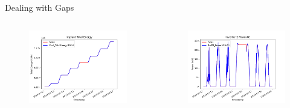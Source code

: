 \begin{frame}{Dealing with Gaps}
\begin{columns}
    \begin{figure}
        \centering
        \includegraphics[width=\textwidth]{sections/2_preprocessing/imgs/totenergybuco2.png}
    \end{figure}
    \begin{figure}
        \centering
        \includegraphics[width=\textwidth]{sections/2_preprocessing/imgs/inv02powerbuco2.png}
    \end{figure}
\end{columns}
\end{frame}